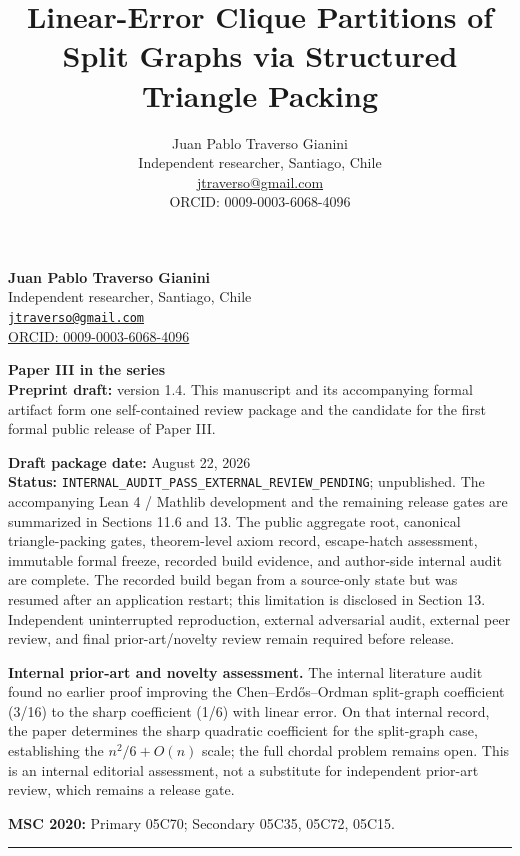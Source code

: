 \documentclass[
  american,
  11pt,
  a4paper,
]{article}
\title{Linear-Error Clique Partitions of Split Graphs via Structured Triangle Packing}
\author{Juan Pablo Traverso Gianini\\
\small Independent researcher, Santiago, Chile\\
\small \href{mailto:jtraverso@gmail.com}{jtraverso@gmail.com}\\
\small ORCID: 0009-0003-6068-4096}
\date{}
\begin{document}
\sloppy
\raggedbottom
\maketitle

\textbf{Juan Pablo Traverso Gianini}\\
Independent researcher, Santiago, Chile\\
\href{mailto:jtraverso@gmail.com}{\nolinkurl{jtraverso@gmail.com}}\\
\href{https://orcid.org/0009-0003-6068-4096}{ORCID: 0009-0003-6068-4096}

\textbf{Paper III in the series}\\
\textbf{Preprint draft:} version 1.4. This manuscript and its accompanying formal artifact form one self-contained review package and the candidate for the first formal public release of Paper III.

\textbf{Draft package date:} August 22, 2026\\
\textbf{Status:} \texttt{INTERNAL\_AUDIT\_PASS\_EXTERNAL\_REVIEW\_PENDING}; unpublished. The accompanying Lean 4 / Mathlib development and the remaining release gates are summarized in Sections 11.6 and 13. The public aggregate root, canonical triangle-packing gates, theorem-level axiom record, escape-hatch assessment, immutable formal freeze, recorded build evidence, and author-side internal audit are complete. The recorded build began from a source-only state but was resumed after an application restart; this limitation is disclosed in Section 13. Independent uninterrupted reproduction, external adversarial audit, external peer review, and final prior-art/novelty review remain required before release.

\textbf{Internal prior-art and novelty assessment.} The internal literature audit found no earlier proof improving the Chen--Erdős--Ordman split-graph coefficient (3/16) to the sharp coefficient (1/6) with linear error. On that internal record, the paper determines the sharp quadratic coefficient for the split-graph case, establishing the \(n^2/6+O(n)\) scale; the full chordal problem remains open. This is an internal editorial assessment, not a substitute for independent prior-art review, which remains a release gate.

\textbf{MSC 2020:} Primary 05C70; Secondary 05C35, 05C72, 05C15.

\begin{center}\rule{0.5\linewidth}{0.5pt}\end{center}
\end{document}
